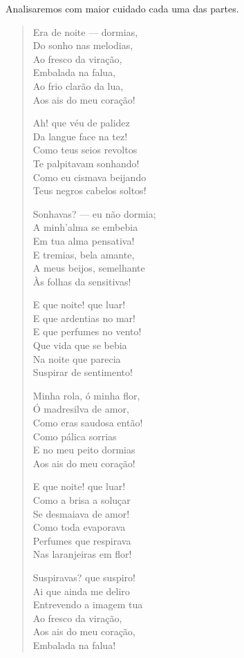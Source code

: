 Analisaremos com maior cuidado cada uma das partes.

\begin{verse}
Era de noite — dormias, \\
Do sonho nas melodias, \\
Ao fresco da viração, \\
Embalada na falua, \\
Ao frio clarão da lua, \\
Aos ais do meu coração!
						
Ah! que véu de palidez \\
Da langue face na tez! \\
Como teus seios revoltos \\
Te palpitavam sonhando! \\
Como eu cismava beijando \\
Teus negros cabelos soltos!
						
Sonhavas? — eu não dormia; \\
A minh'alma se embebia \\
Em tua alma pensativa! \\
E tremias, bela amante, \\
A meus beijos, semelhante \\
Às folhas da sensitivas!
						
E que noite! que luar! \\
E que ardentias no mar! \\
E que perfumes no vento! \\
Que vida que se bebia \\
Na noite que parecia \\
Suspirar de sentimento!
						
Minha rola, ó minha flor, \\
Ó madresilva de amor, \\
Como eras saudosa então! \\
Como pálica sorrias \\
E no meu peito dormias \\
Aos ais do meu coração!

E que noite! que luar! \\
Como a brisa a soluçar \\
Se desmaiava de amor! \\
Como toda evaporava \\
Perfumes que respirava \\
Nas laranjeiras em flor!
						
Suspiravas? que suspiro! \\
Ai que ainda me deliro \\
Entrevendo a imagem tua \\
Ao fresco da viração, \\
Aos ais do meu coração, \\
Embalada na falua!
						

\end{verse}
